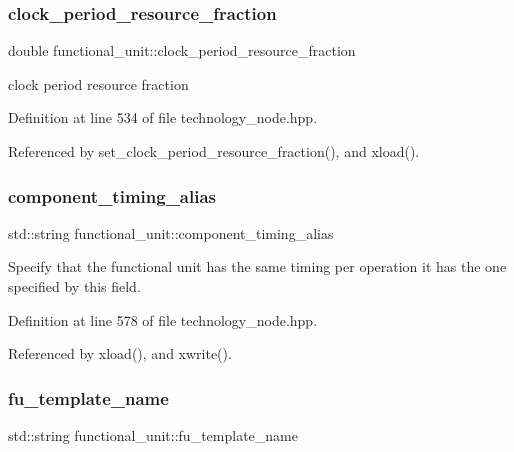 \subsubsection{\texorpdfstring{clock\+\_\+period\+\_\+resource\+\_\+fraction}{clock\_period\_resource\_fraction}}
{\footnotesize\ttfamily double functional\+\_\+unit\+::clock\+\_\+period\+\_\+resource\+\_\+fraction}



clock period resource fraction 



Definition at line 534 of file technology\+\_\+node.\+hpp.



Referenced by set\+\_\+clock\+\_\+period\+\_\+resource\+\_\+fraction(), and xload().

\mbox{\label{structfunctional__unit_ae02faad02a431ad46291ac13f8c4c593}} 
\subsubsection{\texorpdfstring{component\+\_\+timing\+\_\+alias}{component\_timing\_alias}}
{\footnotesize\ttfamily std\+::string functional\+\_\+unit\+::component\+\_\+timing\+\_\+alias}



Specify that the functional unit has the same timing per operation it has the one specified by this field. 



Definition at line 578 of file technology\+\_\+node.\+hpp.



Referenced by xload(), and xwrite().

\mbox{\label{structfunctional__unit_ac969b29e6e1db285793d37ef56f38119}} 
\subsubsection{\texorpdfstring{fu\+\_\+template\+\_\+name}{fu\_template\_name}}
{\footnotesize\ttfamily std\+::string functional\+\_\+unit\+::fu\+\_\+template\+\_\+name}



